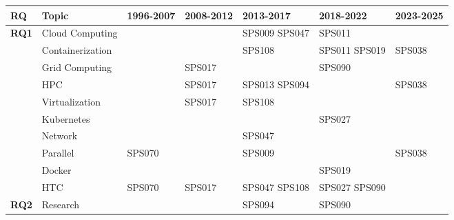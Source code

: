 \begin{table}
	{\fontsize{8}{11}\selectfont
		\begin{tabular}{p{0.8cm}p{2.5cm}p{2cm}p{2cm}p{2.5cm}p{2.5cm}p{2cm}}
			\toprule
			\textbf{RQ}                    & \textbf{Topic}   & \textbf{1996-2007} & \textbf{2008-2012} & \textbf{2013-2017} & \textbf{2018-2022} & \textbf{2023-2025} \\
			\midrule
			\multirow{10}{*}{\textbf{RQ1}} & Cloud Computing  &                    &                    & SPS009 SPS047      & SPS011             &                    \\
			                               & Containerization &                    &                    & SPS108             & SPS011 SPS019      & SPS038             \\
			                               & Grid Computing   &                    & SPS017             &                    & SPS090             &                    \\
			                               & HPC              &                    & SPS017             & SPS013 SPS094      &                    & SPS038             \\
			                               & Virtualization   &                    & SPS017             & SPS108             &                    &                    \\
			                               & Kubernetes       &                    &                    &                    & SPS027             &                    \\
			                               & Network          &                    &                    & SPS047             &                    &                    \\
			                               & Parallel         & SPS070             &                    & SPS009             &                    & SPS038             \\
			                               & Docker           &                    &                    &                    & SPS019             &                    \\
			                               & HTC              & SPS070             & SPS017             & SPS047 SPS108      & SPS027 SPS090      &                    \\
			\midrule
			\multirow{1}{*}{\textbf{RQ2}}  & Research         &                    &                    & SPS094             & SPS090             &                    \\
			\bottomrule
		\end{tabular}}
	\label{table:highest_CVI}
\end{table}

